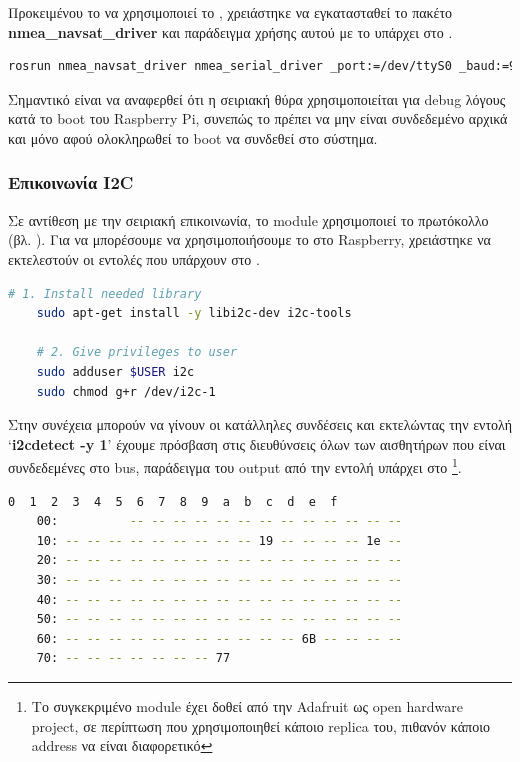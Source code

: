 Προκειμένου το  να χρησιμοποιεί το , χρειάστηκε να εγκατασταθεί το πακέτο \textbf{nmea\_navsat\_driver} \cite{nmea-navsat-driver} και παράδειγμα χρήσης αυτού με το  υπάρχει στο .  

\begin{lstlisting}[language=bash, escapechar=@, caption={GPS - ROS sample usage},label=list:gps-ros-sample-usage]
    rosrun nmea_navsat_driver nmea_serial_driver _port:=/dev/ttyS0 _baud:=9600 
\end{lstlisting}

Σημαντικό είναι να αναφερθεί ότι η σειριακή θύρα χρησιμοποιείται για debug λόγους κατά το boot
του Raspberry Pi, συνεπώς το  πρέπει να μην είναι συνδεδεμένο αρχικά και μόνο αφού ολοκληρωθεί το boot να συνδεθεί στο σύστημα.

\subsubsection{Επικοινωνία I2C}
Σε αντίθεση με την σειριακή επικοινωνία, το  module χρησιμοποιεί το  πρωτόκολλο (βλ. ).
Για να μπορέσουμε να χρησιμοποιήσουμε το  στο Raspberry, χρειάστηκε να εκτελεστούν οι εντολές που υπάρχουν στο .

\begin{lstlisting}[language=bash, escapechar=@, caption={Fix I2C communication},label=list:fix-I2C-communication]
    # 1. Install needed library
    sudo apt-get install -y libi2c-dev i2c-tools 

    # 2. Give privileges to user
    sudo adduser $USER i2c
    sudo chmod g+r /dev/i2c-1
\end{lstlisting}

Στην συνέχεια μπορούν να γίνουν οι κατάλληλες συνδέσεις και εκτελώντας την ε\-ντο\-λή `\textbf{i2cdetect -y 1}' έχουμε πρόσβαση στις διευθύνσεις όλων των αισθητήρων που είναι συνδεδεμένες στο  bus, παράδειγμα του output από την εντολή υπάρχει στο \footnote{Το συγκεκριμένο module έχει δοθεί από την Adafruit ως open hardware project, σε περίπτωση που χρησιμοποιηθεί κάποιο replica του, πιθανόν κάποιο address να είναι διαφορετικό}.

\begin{lstlisting}[language=bash, escapechar=@, caption={I2C addressed output example},label=list:I2C-output]
    0  1  2  3  4  5  6  7  8  9  a  b  c  d  e  f
    00:          -- -- -- -- -- -- -- -- -- -- -- -- -- 
    10: -- -- -- -- -- -- -- -- -- 19 -- -- -- -- 1e -- 
    20: -- -- -- -- -- -- -- -- -- -- -- -- -- -- -- -- 
    30: -- -- -- -- -- -- -- -- -- -- -- -- -- -- -- -- 
    40: -- -- -- -- -- -- -- -- -- -- -- -- -- -- -- -- 
    50: -- -- -- -- -- -- -- -- -- -- -- -- -- -- -- -- 
    60: -- -- -- -- -- -- -- -- -- -- -- 6B -- -- -- -- 
    70: -- -- -- -- -- -- -- 77       
\end{lstlisting}

